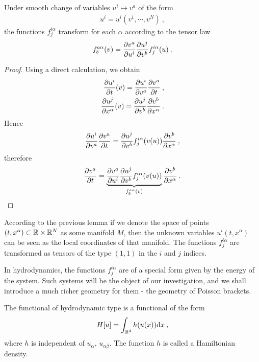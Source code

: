\begin{proposition} 
    \label{prop:transformace-A} 
    Under smooth change of variables $u^i \mapsto v^a$ of the form
    \begin{align}
        u^i = u^i(v^1,\cdots, v^N) \:,
    \end{align}
    the functions $f^{i\alpha}_{j}$ transform for each $\alpha$ according to the tensor law
    \begin{align}
        f^{a \alpha}_{b}(v) = \frac{\partial v^a}{\partial u^i} \frac{\partial u^j}{\partial v^b} f^{i \alpha}_j (u) \:.
    \end{align}
\end{proposition}
\begin{proof}
    Using a direct calculation, we obtain
    \begin{align}
        \frac{\partial u^i}{\partial t}(v) = \frac{\partial u^i}{\partial v^a} \frac{\partial v^a}{\partial t} \:, \\
        \frac{\partial u^j}{\partial x^\alpha}(v) = \frac{\partial u^j}{\partial v^b} \frac{\partial v^b}{\partial x^\alpha}\:.
    \end{align}
    Hence
    \begin{align}
        \frac{\partial u^i}{\partial v^a} \frac{\partial v^a}{\partial t} = \frac{\partial u^j}{\partial v^b} f^{i \alpha}_j (v(u)) \frac{\partial v^b}{\partial x^\alpha} \:,
    \end{align}
    therefore
    \begin{align}
        \frac{\partial v^a}{\partial t} = \underbrace{\frac{\partial v^a}{\partial u^i} \frac{\partial u^j}{\partial v^b} f^{i \alpha}_j(v(u))}_{f^{a \alpha}_b(v)} \frac{\partial v^b}{\partial x^\alpha} \:.
    \end{align}
\end{proof}

According to the previous lemma if we denote the space of points $(t,x^\alpha) \subset \mathbb{R} \times \mathbb{R}^N$ as some manifold $M$, then the unknown variables $u^i(t,x^\alpha)$ can be seen as the local coordinates of that manifold. The functions $f^{i \alpha}_j$ are transformed as tensors of the type $(1,1)$ in the $i$ and $j$ indices.

In hydrodynamics, the functions $f^{i \alpha}_j$ are of a special form given by the energy of the system. Such systems will be the object of our investigation, and we shall introduce a much richer geometry for them - the geometry of Poisson brackets.

\begin{definition} \label{def:hamiltonian-functional}
    The functional of hydrodynamic type is a functional of the form
        \begin{align}
            H[u] = \int_{\mathbb{R}^d} h(u(x)) \mathrm{d} x \:,
        \end{align}
    where $h$ is independent of $u_\alpha$, $u_{\alpha \beta}$. The function $h$ is called a Hamiltonian density.
\end{definition}


